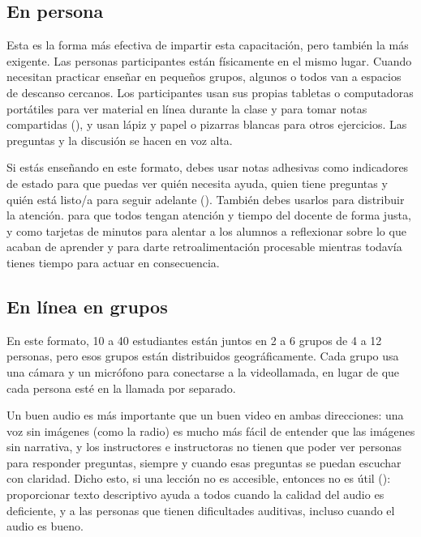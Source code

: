 \subsection*{En persona}

Esta es la forma más efectiva de impartir esta capacitación,
pero también la más exigente.
Las personas participantes están físicamente en el mismo lugar.
Cuando necesitan practicar enseñar en pequeños grupos,
algunos o todos van a espacios de descanso cercanos.
Los participantes usan sus propias tabletas o computadoras portátiles para ver material en línea durante la clase
y para tomar notas compartidas (),
y usan lápiz y papel o pizarras blancas para otros ejercicios.
Las preguntas y la discusión se hacen en voz alta.

Si estás enseñando en este formato,
debes usar notas adhesivas como indicadores de estado
para que puedas ver quién necesita ayuda,
quien tiene preguntas
y quién está listo/a para seguir adelante ().
También debes usarlos para distribuir la atención.
para que todos tengan atención y tiempo del docente de forma justa,
y como tarjetas de minutos para alentar a los alumnos a reflexionar sobre lo que acaban de aprender
y para darte retroalimentación procesable mientras todavía tienes tiempo para actuar en consecuencia.

\subsection*{En línea en grupos}

En este formato,
10 a 40 estudiantes están juntos en 2 a 6 grupos de 4 a 12 personas,
pero esos grupos están distribuidos geográficamente.
Cada grupo usa una cámara y un micrófono para conectarse a la videollamada,
en lugar de que cada persona esté en la llamada por separado.

Un buen audio es más importante que un buen video en ambas direcciones:
una voz sin imágenes (como la radio)
es mucho más fácil de entender que las imágenes sin narrativa,
y los instructores e instructoras no tienen que poder ver personas para responder preguntas,
siempre y cuando esas preguntas se puedan escuchar con claridad.
Dicho esto,
si una lección no es accesible, entonces no es útil ():
proporcionar texto descriptivo ayuda a todos cuando la calidad del audio es deficiente,
y a las personas que tienen dificultades auditivas, incluso cuando el audio es bueno.

